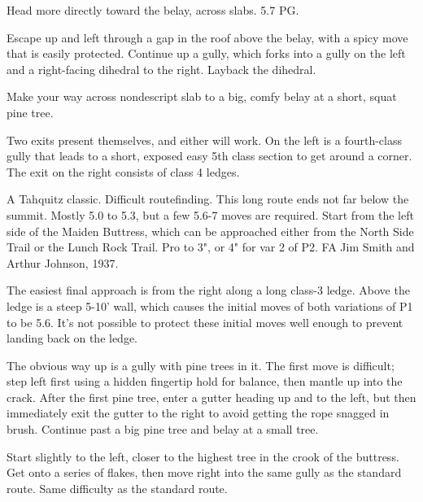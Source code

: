 \documentclass{tahquitz}
\begin{document}
 Head more directly toward the belay, across slabs. 5.7 PG.

 Escape up and left through a gap in the roof above the belay, with a spicy move
that is easily protected. Continue up a gully, which forks into a gully on the left and a right-facing
dihedral to the right. Layback the dihedral.

 Make your way across nondescript slab to a big, comfy belay at a short, squat pine tree.

 Two exits present themselves, and either will work. On the left is a fourth-class
gully that leads to a short, exposed easy 5th class section to get around a corner.
The exit on the right consists of class 4 ledges.

\somespace

\northgully





A Tahquitz classic. Difficult routefinding. This long route ends not far
below the summit.
Mostly 5.0 to 5.3, but a few 5.6-7 moves are required.
Start from the left side of the Maiden Buttress, which can be
approached either from the North Side Trail or the Lunch Rock Trail.
Pro to 3", or 4" for var 2 of P2.
FA Jim Smith and Arthur Johnson, 1937.

The easiest final approach is from the right along a long class-3 ledge.
Above the ledge is a steep 5-10' wall, which causes the initial moves of
both variations of P1 to be 5.6. It's not possible to protect these initial
moves well enough to prevent landing back on the ledge.

 The obvious way up is a gully with pine trees in it. The first move is difficult;
step left first using a hidden fingertip hold for balance, then mantle
up into the crack.
After the first pine tree, enter a gutter heading up
and to the left, but then immediately exit the gutter to the right to
avoid getting the rope snagged in brush. Continue past a big pine
tree and belay at a small tree.

 Start slightly to the left, closer to the highest tree in the crook of
the buttress. Get onto a series of flakes, then move right into the same gully as the standard route. Same
difficulty as the standard route.
\end{document}
